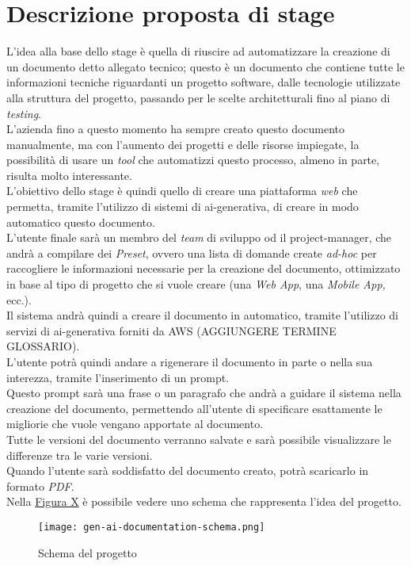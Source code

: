 \section{Descrizione proposta di stage}
\label{sez:descrizione-stage}

L'idea alla base dello stage è quella di riuscire ad automatizzare la creazione di un documento detto allegato tecnico; questo è un documento che contiene
tutte le informazioni tecniche riguardanti un progetto software, dalle tecnologie utilizzate alla struttura del progetto, passando per le scelte architetturali fino al piano di \textit{testing}.\\
L'azienda fino a questo momento ha sempre creato questo documento manualmente, ma con l'aumento dei progetti e delle risorse impiegate, la possibilità di usare un \textit{tool} che automatizzi questo processo,
almeno in parte, risulta molto interessante.\\

\noindent L'obiettivo dello stage è quindi quello di creare una piattaforma \textit{web} che permetta, tramite l'utilizzo di sistemi di \gls{ai-generativa}, di creare in modo automatico questo documento. \\
L'utente finale sarà un membro del \textit{team} di sviluppo od il \gls{project-manager}, che andrà a compilare dei \textit{Preset}, ovvero una lista di domande create \textit{ad-hoc} per raccogliere le informazioni necessarie per la creazione del documento,
ottimizzato in base al tipo di progetto che si vuole creare (una \textit{Web App}, una \textit {Mobile App,} ecc.).\\
Il sistema andrà quindi a creare il documento in automatico, tramite l'utilizzo di servizi di \gls{ai-generativa} forniti da AWS (AGGIUNGERE TERMINE GLOSSARIO). \\

\noindent L'utente potrà quindi andare a rigenerare il documento in parte o nella sua interezza, tramite l'inserimento di un \gls{prompt}.\\
Questo \gls{prompt} sarà una frase o un paragrafo che andrà a guidare il sistema nella creazione del documento, permettendo all'utente di specificare esattamente le migliorie che vuole vengano apportate al documento.\\
Tutte le versioni del documento verranno salvate e sarà possibile  visualizzare le differenze tra le varie versioni.\\
Quando l'utente sarà soddisfatto del documento creato, potrà scaricarlo in formato \textit{PDF}.\\
Nella {\hyperref[fig:project-schema]{Figura X}} è possibile vedere uno schema che rappresenta l'idea del progetto.\\

\begin{figure}[H]
    \label{fig:project-schema}
    \centering
    \texttt{[image: gen-ai-documentation-schema.png]}
    \caption{Schema del progetto}
\end{figure}